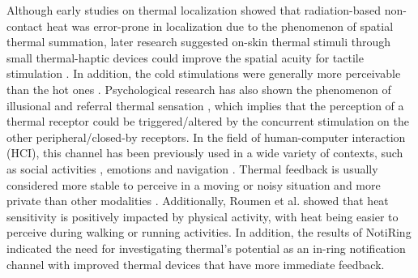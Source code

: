 \documentclass[preprint,12pt]{elsarticle}
\begin{document}
Although early studies \cite{26,27,31} on thermal localization showed that radiation-based non-contact heat was error-prone in localization due to the phenomenon of spatial thermal summation, later research suggested on-skin thermal stimuli through small thermal-haptic devices could improve the spatial acuity for tactile stimulation \cite{28}. In addition, the cold stimulations were generally more perceivable than the hot ones \cite{42}. Psychological research has also shown the phenomenon of illusional and referral thermal sensation \cite{6}, which implies that the perception of a thermal receptor could be triggered/altered by the concurrent stimulation on the other peripheral/closed-by receptors. In the field of human-computer interaction (HCI), this channel has been previously used in a wide variety of contexts, such as social activities \cite{40}, emotions \cite{35,37,41} and navigation \cite{34}. Thermal feedback is usually considered more stable to perceive in a moving or noisy situation and  more private than other modalities \cite{10}. Additionally, Roumen et al. \cite{24} showed that heat sensitivity is positively impacted by physical activity, with heat being easier to perceive during walking or running activities. In addition, the results of NotiRing indicated the need for investigating thermal's potential as an in-ring notification channel with improved thermal devices that have more immediate feedback.
\end{document}
